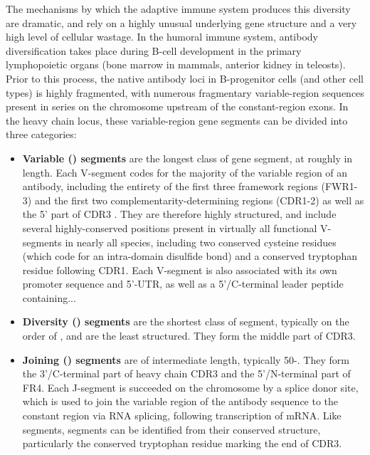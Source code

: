 The mechanisms by which the adaptive immune system produces this diversity are dramatic, and rely on a highly unusual underlying gene structure and a very high level of cellular wastage. In the humoral immune system, antibody diversification takes place during B-cell development in the primary lymphopoietic organs (bone marrow in mammals, anterior kidney in teleosts). Prior to this process, the native antibody loci in B-progenitor cells (and other cell types) is highly fragmented, with numerous fragmentary variable-region sequences present in series on the chromosome upstream of the constant-region exons. In the heavy chain locus, these variable-region gene segments can be divided into three categories:

\begin{itemize}
\item \textbf{Variable (\vh) segments} are the longest class of gene segment, at roughly  in length. Each V-segment codes for the majority of the variable region of an antibody, including the entirety of the first three framework regions (FWR1-3) and the first two complementarity-determining regions (CDR1-2) as well as the 5' part of CDR3 \parencite{jung2006vdjr}. They are therefore highly structured, and include several highly-conserved positions present in virtually all functional V-segments in nearly all species, including two conserved cysteine residues (which code for an intra-domain disulfide bond) and a conserved tryptophan residue following CDR1. Each V-segment is also associated with its own promoter sequence and 5'-UTR, as well as a 5'/C-terminal leader peptide containing... %
\item \textbf{Diversity (\dh) segments} are the shortest class of segment, typically on the order of , and are the least structured. They form the middle part of CDR3.  %
\item \textbf{Joining (\jh) segments} are of intermediate length, typically 50-. They form the 3'/C-terminal part of heavy chain CDR3 and the 5'/N-terminal part of FR4. Each J-segment is succeeded on the chromosome by a splice donor site, which is used to join the variable region of the antibody sequence to the constant region via RNA splicing, following transcription of \igh{} mRNA. Like \vh segments, \jh segments can be identified from their conserved structure, particularly the conserved tryptophan residue marking the end of CDR3.
\end{itemize}

